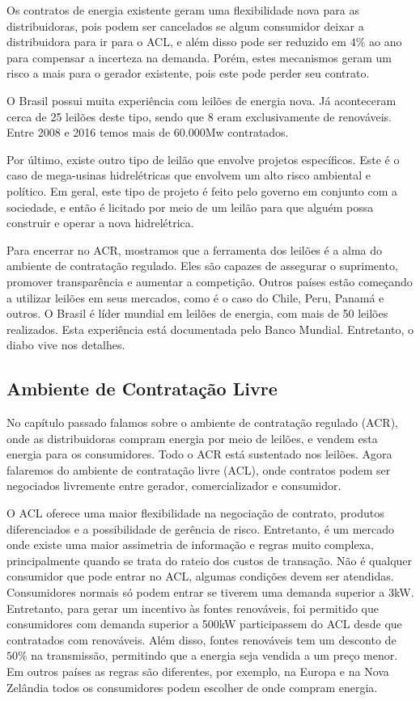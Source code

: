 Os contratos de energia existente geram uma flexibilidade nova para as distribuidoras, pois podem ser cancelados se algum consumidor deixar a distribuidora para ir para o ACL, e além disso pode ser reduzido em $4\%$ ao ano para compensar a incerteza na demanda. Porém, estes mecanismos geram um risco a mais para o gerador existente, pois este pode perder seu contrato. 

O Brasil possui muita experiência com leilões de energia nova. Já aconteceram cerca de 25 leilões deste tipo, sendo que 8 eram exclusivamente de renováveis. Entre 2008 e 2016 temos mais de 60.000Mw contratados. 

Por último, existe outro tipo de leilão que envolve projetos específicos. Este é o caso de mega-usinas hidrelétricas que envolvem um alto risco ambiental e político. Em geral, este tipo de projeto é feito pelo governo em conjunto com a sociedade, e então é licitado por meio de um leilão para que alguém possa construir e operar a nova hidrelétrica. 

Para encerrar no ACR, mostramos que a ferramenta dos leilões é a alma do ambiente de contratação regulado. Eles são capazes de assegurar o suprimento, promover transparência e aumentar a competição. Outros países estão começando a utilizar leilões em seus mercados, como é o caso do Chile, Peru, Panamá e outros. O Brasil é líder mundial em leilões de energia, com mais de 50 leilões realizados. Esta experiência está documentada pelo Banco Mundial. Entretanto, o diabo vive nos detalhes. 


\subsection{Ambiente de Contratação Livre}

No capítulo passado falamos sobre o ambiente de contratação regulado (ACR), onde as distribuidoras compram energia por meio de leilões, e vendem esta energia para os consumidores. Todo o ACR está sustentado nos leilões. Agora falaremos do ambiente de contratação livre (ACL), onde contratos podem ser negociados livremente entre gerador, comercializador e consumidor. 

O ACL oferece uma maior flexibilidade na negociação de contrato, produtos diferenciados e a possibilidade de gerência de risco. Entretanto, é um mercado onde existe uma maior assimetria de informação e regras muito complexa, principalmente quando se trata do rateio dos custos de transação. Não é qualquer consumidor que pode entrar no ACL, algumas condições devem ser atendidas. Consumidores normais só podem entrar se tiverem uma demanda superior a 3kW. Entretanto, para gerar um incentivo às fontes renováveis, foi permitido que consumidores com demanda superior a 500kW participassem do ACL desde que contratados com renováveis. Além disso, fontes renováveis tem um desconto de $50\%$ na transmissão, permitindo que a energia seja vendida a um preço menor. Em outros países as regras são diferentes, por exemplo, na Europa e na Nova Zelândia todos os consumidores podem escolher de onde compram energia. 

